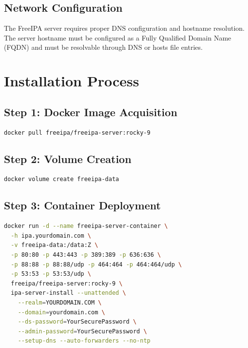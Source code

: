 \documentclass[12pt,a4paper]{report}
\begin{document}
\subsection{Network Configuration}

The FreeIPA server requires proper DNS configuration and hostname resolution. The server hostname must be configured as a Fully Qualified Domain Name (FQDN) and must be resolvable through DNS or hosts file entries.

\section{Installation Process}

\subsection{Step 1: Docker Image Acquisition}

\begin{lstlisting}[language=bash,caption=Pull FreeIPA Docker Image]
docker pull freeipa/freeipa-server:rocky-9
\end{lstlisting}

\subsection{Step 2: Volume Creation}

\begin{lstlisting}[language=bash,caption=Create Persistent Data Volume]
docker volume create freeipa-data
\end{lstlisting}

\subsection{Step 3: Container Deployment}

\begin{lstlisting}[language=bash,caption=Deploy FreeIPA Container]
docker run -d --name freeipa-server-container \
  -h ipa.yourdomain.com \
  -v freeipa-data:/data:Z \
  -p 80:80 -p 443:443 -p 389:389 -p 636:636 \
  -p 88:88 -p 88:88/udp -p 464:464 -p 464:464/udp \
  -p 53:53 -p 53:53/udp \
  freeipa/freeipa-server:rocky-9 \
  ipa-server-install --unattended \
    --realm=YOURDOMAIN.COM \
    --domain=yourdomain.com \
    --ds-password=YourSecurePassword \
    --admin-password=YourSecurePassword \
    --setup-dns --auto-forwarders --no-ntp
\end{lstlisting}
\end{document}

